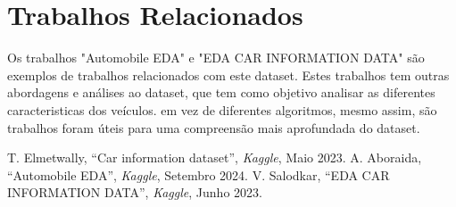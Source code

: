 \documentclass[conference]{IEEEtran}
\begin{document}
\section{Trabalhos Relacionados}
Os trabalhos "Automobile EDA" \cite{ref2} e "EDA CAR INFORMATION DATA" \cite{ref3} são exemplos de trabalhos relacionados com este dataset.
Estes trabalhos tem outras abordagens e análises ao dataset, que tem como objetivo analisar as diferentes caracteristicas dos veículos.
 em vez de diferentes algoritmos, mesmo assim, são trabalhos foram úteis para uma compreensão mais aprofundada do dataset.

\begin{thebibliography}{1}
     T. Elmetwally, “Car information dataset”, \textit{Kaggle}, Maio 2023.
     A. Aboraida, “Automobile EDA”, \textit{Kaggle}, Setembro 2024.
     V. Salodkar, “EDA CAR INFORMATION DATA”, \textit{Kaggle}, Junho 2023.
\end{thebibliography}
\end{document}
